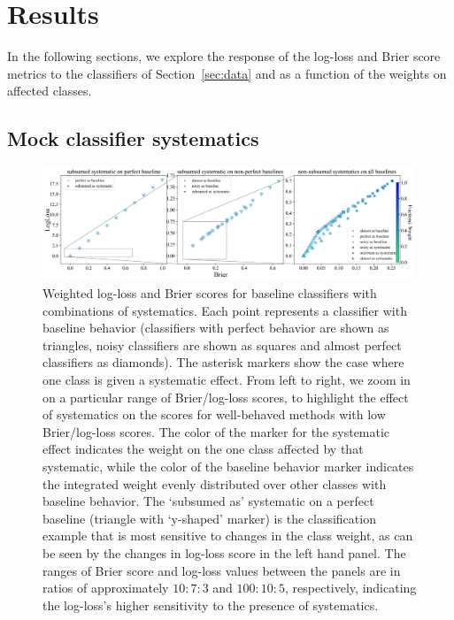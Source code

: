 \section{Results}
\label{sec:results}

In the following sections, we explore the response of the log-loss and Brier score metrics to the classifiers of Section~\ref{sec:data} and as a function of the weights on affected classes.

\subsection{Mock classifier systematics}
\label{sec:mockresults}

\begin{figure}
	\begin{center}
		\includegraphics[width=0.99\textwidth]{./fig/multipanel_res.png}
		\caption{Weighted log-loss and Brier scores for baseline classifiers with combinations of systematics.
		Each point represents a classifier with baseline behavior (classifiers with perfect behavior are shown as triangles, noisy classifiers are shown as squares and almost perfect classifiers as diamonds). The asterisk markers show the case where one class is given a systematic effect. From left to right, we zoom in on a particular range of Brier/log-loss scores, to highlight the effect of systematics on the scores for well-behaved methods with low Brier/log-loss scores. 
		The color of the marker for the systematic effect indicates the weight on the one class affected by that systematic, while the color of the baseline behavior marker indicates the integrated weight evenly distributed over other classes with baseline behavior. The `subsumed as' systematic on a perfect baseline (triangle with `y-shaped' marker) is the classification example that is most sensitive to changes in the class weight, as can be seen by the changes in log-loss score in the left hand panel.
		The ranges of Brier score and log-loss values between the panels are in ratios of approximately $10:7:3$ and $100:10:5$, respectively, indicating the log-loss's higher sensitivity to the presence of systematics.
		}
	\end{center}
	\label{fig:all_combined}
\end{figure}


